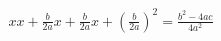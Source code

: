 \documentclass[preview]{standalone}
\begin{document}
\begin{align*}
x x + \frac{b}{2 a} x + \frac{b}{2 a} x + {\left( \frac{b}{2 a} \right)}^{2} = \frac{{b}^{2} - 4 a c}{4 {a}^{2}}
\end{align*}
\end{document}
